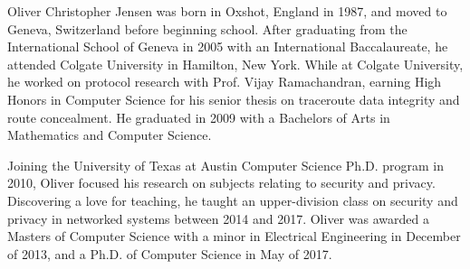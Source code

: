 Oliver Christopher Jensen was born in Oxshot, England in 1987, and moved to Geneva, Switzerland before beginning school.
After graduating from the International School of Geneva in 2005 with an International Baccalaureate,
    he attended Colgate University in Hamilton, New York.
While at Colgate University, he worked on protocol research with Prof. Vijay Ramachandran,
    earning High Honors in Computer Science for his senior thesis on traceroute data integrity and route concealment.
He graduated in 2009 with a Bachelors of Arts in Mathematics and Computer Science.

Joining the University of Texas at Austin Computer Science Ph.D. program in 2010,
    Oliver focused his research on subjects relating to security and privacy.
Discovering a love for teaching, he taught an upper-division class on security and privacy in networked systems between 2014 and 2017.
Oliver was awarded a Masters of Computer Science with a minor in Electrical Engineering in December of 2013,
    and a Ph.D. of Computer Science in May of 2017.